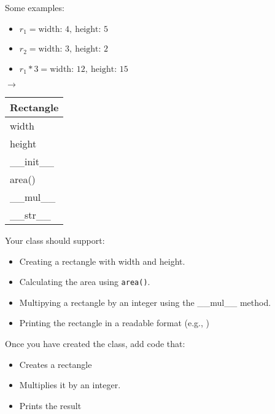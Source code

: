 		\begin{minipage}[t]{0.7\textwidth}
			Some examples:
			\begin{itemize}
				\item $r_1 = \text{width: } 4,\ \text{height: } 5$
				\item $r_2 = \text{width: } 3,\ \text{height: } 2$
				\item $r_1 * 3 = \text{width: } 12,\ \text{height: } 15$
			\end{itemize}

			\begin{minipage}{0.25\textwidth}
			\end{minipage}
			{\Large $\longrightarrow$} \hspace*{2em}
			\begin{minipage}{0.65\textwidth}
			\end{minipage}
		\end{minipage}
		\hfill
		\begin{minipage}[t]{0.2\textwidth}
			\vspace{.2em}
			\begin{flushright}
				\begin{tabular}{|l|}
					\hline
					Rectangle \\ \hline
					width \\
					height \\ \hline
					\_\_init\_\_ \\
					area() \\
					\_\_mul\_\_ \\
					\_\_str\_\_ \\ \hline
				\end{tabular}
			\end{flushright}
		\end{minipage}
		
		Your class should support:
		\begin{itemize}
			\item Creating a rectangle with width and height.
			\item Calculating the area using \texttt{area()}.
			\item Multipying a rectangle by an integer using the  \_\_mul\_\_ method.
			\item Printing the rectangle in a readable format (e.g., )
		\end{itemize}
		
		Once you have created the class, add code that:
		\begin{itemize}
			\item Creates a rectangle
			\item Multiplies it by an integer.
			\item Prints the result
		\end{itemize}


